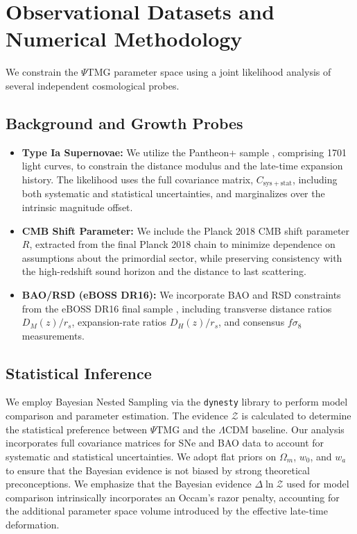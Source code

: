 \documentclass[10pt,twocolumn,secnumarabic,amssymb, nobibnotes, aps, prd, floatfix]{revtex4-2}
\begin{document}
\section{Observational Datasets and Numerical Methodology}
\nopagebreak

We constrain the $\Psi$TMG parameter space using a joint likelihood analysis of several independent cosmological probes.

\subsection{Background and Growth Probes}

\begin{itemize}
\item \textbf{Type Ia Supernovae:} We utilize the Pantheon+ sample \cite{Brout2022PantheonPlus}, comprising 1701 light curves, to constrain the distance modulus and the late-time expansion history. The likelihood uses the full covariance matrix, $C_{\mathrm{sys+stat}}$, including both systematic and statistical uncertainties, and marginalizes over the intrinsic magnitude offset.
\item \textbf{CMB Shift Parameter:} We include the Planck 2018 CMB shift parameter $R$, extracted from the final Planck 2018 chain \cite{Planck2020Cosmoparams} to minimize dependence on assumptions about the primordial sector, while preserving consistency with the high-redshift sound horizon and the distance to last scattering.
\item \textbf{BAO/RSD (eBOSS DR16):} We incorporate BAO and RSD constraints from the eBOSS DR16 final sample \cite{Alam2021eBOSS}, including transverse distance ratios $D_M(z)/r_s$, expansion-rate ratios $D_H(z)/r_s$, and consensus $f\sigma_8$ measurements.
\end{itemize}

\subsection{Statistical Inference}

We employ Bayesian Nested Sampling via the \texttt{dynesty} library to perform model comparison and parameter estimation. The evidence $\mathcal{Z}$ is calculated to determine the statistical preference between $\Psi$TMG and the $\Lambda$CDM baseline. Our analysis incorporates full covariance matrices for SNe and BAO data to account for systematic and statistical uncertainties. We adopt flat priors on $\Omega_m$, $w_0$, and $w_a$ to ensure that the Bayesian evidence is not biased by strong theoretical preconceptions.
We emphasize that the Bayesian evidence $\Delta \ln \mathcal{Z}$ used for model comparison intrinsically incorporates an Occam’s razor penalty, accounting for the additional parameter space volume introduced by the effective late-time deformation.
\end{document}
